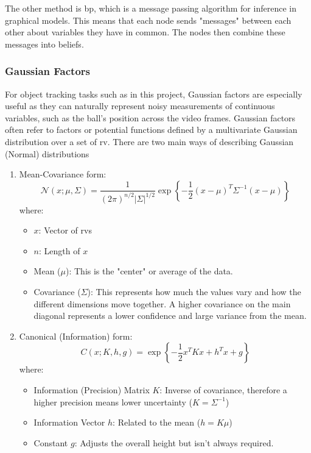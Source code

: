 \documentclass[12pt,a4paper]{article}
\begin{document}
The other method is \acs{bp}, which is a message passing algorithm for inference in graphical models. This means that each node sends "messages" between each other about variables they have in common. The nodes then combine these messages into beliefs.

\subsubsection{Gaussian Factors}
For object tracking tasks such as in this project, Gaussian factors are especially useful as they can naturally represent noisy measurements of continuous variables, such as the ball's position across the video frames.
Gaussian factors often refer to factors or potential functions defined by a multivariate Gaussian distribution over a set of \acs{rv}. There are two main ways of describing Gaussian (Normal) distributions 

\begin{enumerate}
	\item Mean-Covariance form:\\
	\begin{equation}
	\mathcal{N}(x; \mu, \Sigma) = \frac{1}{(2\pi)^{n/2} |\Sigma|^{1/2}}\exp\left\{ -\frac{1}{2} (x - \mu)^T \Sigma^{-1} (x - \mu) \right\}
	\end{equation}
	where:
	\begin{itemize}
	\item $x$: Vector of \acs{rv}s
	\item $n$: Length of $x$  
	\item Mean ($\mu$): This is the "center" or average of the data.
	\item Covariance ($\Sigma$): This represents how much the values vary and how the different dimensions move together. A higher covariance on the main diagonal represents a lower confidence and large variance from the mean.
	\end{itemize}
	\item Canonical (Information) form:
	\begin{equation}
	C(x; K, h, g) = \exp\left\{ -\frac{1}{2} x^T K x + h^T x + g \right\}
	\end{equation}
	where:
	\begin{itemize}
	\item Information (Precision) Matrix $K$: Inverse of covariance, therefore a higher precision means lower uncertainty ($K = \Sigma^{-1}$)
	\item Information Vector $h$: Related to the mean ($h = K \mu$)
	\item Constant $g$: Adjusts the overall height but isn't always required.
	\end{itemize}
\end{enumerate}
\end{document}
